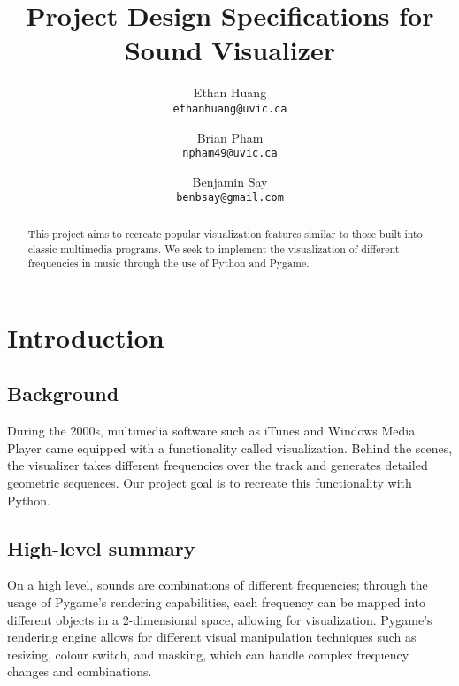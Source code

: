 \documentclass{article}
\title{Project Design Specifications for Sound Visualizer}
\author{
  Ethan Huang\\
  \texttt{ethanhuang@uvic.ca}
  \and
  Brian Pham\\
  \texttt{npham49@uvic.ca}
  \and
  Benjamin Say\\
  \texttt{benbsay@gmail.com}
}
\begin{document}
\maketitle

\begin{abstract}
This project aims to recreate popular visualization features similar to those built into classic multimedia programs. We seek to implement the visualization of different frequencies in music through the use of Python and Pygame.
\end{abstract}

\section{Introduction}\label{sec:introduction}

\subsection{Background}
During the 2000s, multimedia software such as iTunes and Windows Media Player came equipped with a functionality called visualization. Behind the scenes, the visualizer takes different frequencies over the track and generates detailed geometric sequences. Our project goal is to recreate this functionality with Python. 

\subsection{High-level summary}
On a high level, sounds are combinations of different frequencies; through the usage of Pygame's rendering capabilities, each frequency can be mapped into different objects in a 2-dimensional space, allowing for visualization. Pygame's rendering engine allows for different visual manipulation techniques such as resizing, colour switch, and masking, which can handle complex frequency changes and combinations. 
\end{document}
